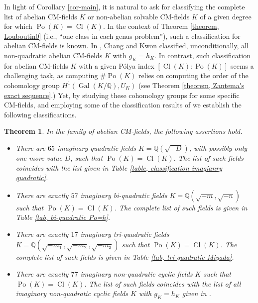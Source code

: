 \documentclass[12pt]{amsart}
\newtheorem{theorem}{Theorem}[section]
\theoremstyle{definition}
\numberwithin{equation}{section}
\DeclareMathOperator{\Po}{Po}
\DeclareMathOperator{\Cl}{Cl}
\DeclareMathOperator{\Gal}{Gal}
\begin{document}
In light of Corollary \ref{cor-main}, it is natural to ask for classifying the complete list of abelian CM-fields $K$ or non-abelian solvable CM-fields $K$ of a given degree for which $\Po(K)=\Cl(K)$. In the context of Theorem  \ref{theorem, Louboutin0} (i.e., ``one class in each genus problem''), such a classification for abelian CM-fields is known. In \cite{CK},  
Chang and Kwon classified, unconditionally,  all non-quadratic abelian CM-fields $K$ with $g_K=h_K$. In contrast, such classification for abelian CM-fields $K$ with a given P\'olya index $\left[\Cl(K):\Po(K)\right]$ seems a challenging task, as computing $\# \Po(K)$ relies on computing the order of the cohomology group $H^1(\Gal(K/\mathbb{Q}),U_K)$ (see Theorem \ref{theorem, Zantema's exact sequence}.) Yet, by studying these cohomology groups for some specific
CM-fields, and
employing some of the classification results of \cite{CK}  
we establish the following classifications.
\begin{theorem}
\label{theorem,classification}
In the family of abelian CM-fields, the following assertions hold.
\begin{itemize}
	\item[(i)] There are $65$ imaginary quadratic fields $K=\mathbb{Q}(\sqrt{-D})$, with possibly only one more value $D$,  such that $\Po(K)=\Cl(K)$.  The list of such fields coincides with the list given in Table \ref{table, classification imagianry quadratic}.
	\item[(ii)] There are exactly $57$ imaginary bi-quadratic fields $K=\mathbb{Q}(\sqrt{-m}, \sqrt{-n})$ such that $\Po(K)=\Cl(K)$. The complete list of such fields is given in Table \ref{tab, bi-quadratic Po=h}.
	\item[(iii)] There are exactly $17$ imaginary tri-quadratic fields $K=\mathbb{Q}(\sqrt{-m_1}, \sqrt{-m_2}, \sqrt{-m_3})$ such that $\Po(K)=\Cl(K)$. The complete list of such fields is given in Table  \ref{tab, tri-quadratic Miyada}.
	\item[(iv)] There are exactly $77$ imaginary non-quadratic cyclic fields $K$ such that $\Po(K)=\Cl(K)$. The list of such fields coincides with the list of all imaginary non-quadratic cyclic fields $K$ with $g_K=h_K$ given in \cite[Table 1]{CK}. 
	\end{itemize}
\end{theorem}
\end{document}
